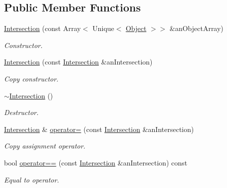 \subsection*{Public Member Functions}
\begin{DoxyCompactItemize}
\item 
\hyperlink{classlibrary_1_1math_1_1geom_1_1d3_1_1_intersection_ab800dbab95076a1d7ae47bd9d0887da3}{Intersection} (const Array$<$ Unique$<$ \hyperlink{classlibrary_1_1math_1_1geom_1_1d3_1_1_object}{Object} $>$$>$ \&an\+Object\+Array)
\begin{DoxyCompactList}\small\item\em Constructor. \end{DoxyCompactList}\item 
\hyperlink{classlibrary_1_1math_1_1geom_1_1d3_1_1_intersection_a6eacd360660163afafb78178d25ad714}{Intersection} (const \hyperlink{classlibrary_1_1math_1_1geom_1_1d3_1_1_intersection}{Intersection} \&an\+Intersection)
\begin{DoxyCompactList}\small\item\em Copy constructor. \end{DoxyCompactList}\item 
\hyperlink{classlibrary_1_1math_1_1geom_1_1d3_1_1_intersection_af2c13f6bc69d8271600d0f30848dd64b}{$\sim$\+Intersection} ()
\begin{DoxyCompactList}\small\item\em Destructor. \end{DoxyCompactList}\item 
\hyperlink{classlibrary_1_1math_1_1geom_1_1d3_1_1_intersection}{Intersection} \& \hyperlink{classlibrary_1_1math_1_1geom_1_1d3_1_1_intersection_a41ca5e5ac6fe7bc3f26f516acde56be8}{operator=} (const \hyperlink{classlibrary_1_1math_1_1geom_1_1d3_1_1_intersection}{Intersection} \&an\+Intersection)
\begin{DoxyCompactList}\small\item\em Copy assignment operator. \end{DoxyCompactList}\item 
bool \hyperlink{classlibrary_1_1math_1_1geom_1_1d3_1_1_intersection_a4205e2dcace3faa8abfeb829423d0baf}{operator==} (const \hyperlink{classlibrary_1_1math_1_1geom_1_1d3_1_1_intersection}{Intersection} \&an\+Intersection) const
\begin{DoxyCompactList}\small\item\em Equal to operator. \end{DoxyCompactList}\item 
$$
\end{DoxyCompactItemize}

